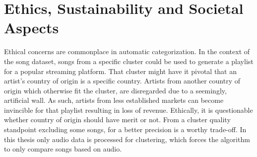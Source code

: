 \documentclass[../report.tex]{subfiles}
\begin{document}

\section{Ethics, Sustainability and \newline Societal Aspects}
Ethical concerns are commonplace in automatic categorization. In the context of the song dataset, songs from a specific cluster could be used to generate a playlist for a popular streaming platform. That cluster might have it pivotal that an artist's country of origin is a specific country. Artists from another country of origin which otherwise fit the cluster, are disregarded due to a seemingly, artificial wall. As such, artists from less established markets can become invincible for that playlist resulting in loss of revenue. Ethically, it is questionable whether country of origin should have merit or not. From a cluster quality standpoint excluding some songs, for a better precision is a worthy trade-off. In this thesis only audio data is processed for clustering, which forces the algorithm to only compare songs based on audio.
\end{document}
